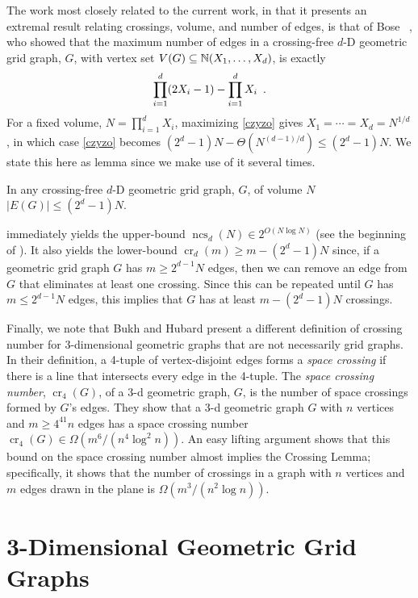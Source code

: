 \documentclass[12pt]{article}
\newcommand{\n}{N}
\DeclareMathOperator{\crs}{cr}
\DeclareMathOperator{\ncs}{ncs}
\begin{document}
The work most closely related to the current work, in that it presents
an extremal result relating crossings, volume, and number of edges, is
that of Bose \etal~\cite{bose.czyzowicz.ea:maximum}, who showed that the
maximum number of edges in a crossing-free $d$-D geometric grid graph,
$G$, with vertex set $V(G)\subseteq \mathbb{N}(X_1,\ldots,X_d)$, is exactly
\begin{equation}
    \prod_{i=1}^d (2X_i-1) - \prod_{i=1}^d X_i \enspace . \eqlabel{czyzo}
\end{equation}
For a fixed volume, $\n=\prod_{i=1}^d X_i$, maximizing \eqref{czyzo} gives
$X_1=\cdots=X_d=\n^{1/d}$, in which case \eqref{czyzo} becomes $(2^d-1)\n -
\Theta(\n^{(d-1)/d})\le (2^d-1)\n$.  We state this here as lemma since we
make use of it several times.
\begin{lem}
  In any crossing-free $d$-D geometric grid graph, $G$, of volume $\n$
  $|E(G)|\le(2^d-1)\n$.
\end{lem}
 immediately yields the upper-bound
$\ncs_d(\n)\in2^{O(\n\log\n)}$ (see the beginning of ).
It also yields the lower-bound $\crs_d(m)\ge m-(2^{d}-1)N$ since,
if a geometric grid graph $G$ has $m\ge 2^{d-1}N$ edges, then we can
remove an edge from $G$ that eliminates at least one crossing.
Since this can be repeated until $G$ has $m\le 2^{d-1}N$ edges, this
implies that $G$ has at least $m-(2^d-1)N$ crossings.

Finally, we note that Bukh and Hubard \cite{bukh.hubard:space} present a
different definition of crossing number for 3-dimensional geometric graphs
that are not necessarily grid graphs.  In their definition, a 4-tuple
of vertex-disjoint edges forms a \emph{space crossing} if there is
a line that intersects every edge in the 4-tuple.  The \emph{space
crossing number}, $\crs_4(G)$, of a 3-d geometric graph, $G$, is the
number of space crossings formed by $G$'s edges.  They show that a
3-d geometric graph $G$ with $n$ vertices and $m\ge 4^{41}n$ edges
has a space crossing number $\crs_4(G) \in \Omega(m^6/(n^4\log^2 n))$.
An easy lifting argument shows that this bound on the space crossing
number almost implies the Crossing Lemma; specifically, it shows that
the number of crossings in a graph with $n$ vertices and $m$ edges drawn
in the plane is $\Omega(m^3/(n^2\log n))$.

\section{3-Dimensional Geometric Grid Graphs}
\end{document}

